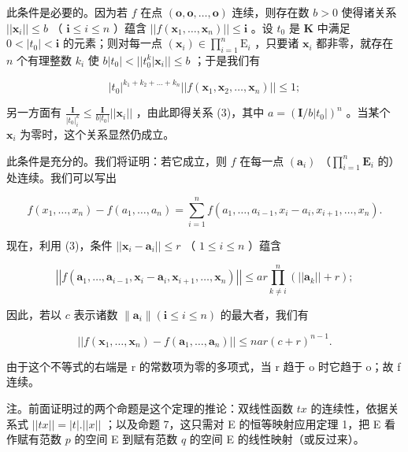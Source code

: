 此条件是必要的。因为若 \(f\) 在点 \((\mathbf{o}, \mathbf{o}, \ldots, \mathbf{o})\) 连续，则存在数 \(b > 0\) 使得诸关系 \(||\boldsymbol{x}_i|| \leqslant b\) （ \(\mathbf{i} \leqslant i \leqslant n\) ）蕴含 \(||f(\boldsymbol{x}_1, \ldots, \boldsymbol{x}_n)|| \leqslant \mathbf{i}\) 。设 \(t_0\) 是 \(\mathbf{K}\) 中满足 \(0 < |t_0| < \mathbf{i}\) 的元素；则对每一点 \((\boldsymbol{x}_i) \in \prod_{i=1}^{n} \mathrm{E}_i\) ，只要诸 \(\boldsymbol{x}_i\) 都非零，就存在 \(n\) 个有理整数 \(k_i\) 使 \(b|t_0| < ||t_0^k |\boldsymbol{x}_i|| \leqslant b\) ；于是我们有

\[
\left| t _ {0} \right| ^ {k _ {1} + k _ {2} + \dots + k _ {n}} \left| \left| f \left(\boldsymbol {x} _ {1}, \boldsymbol {x} _ {2}, \dots , \boldsymbol {x} _ {n}\right) \right| \right| \leqslant 1;
\]

另一方面有 \(\frac{\mathbf{I}}{|t_0|^k_i} \leqslant \frac{\mathbf{I}}{b|t_0|} ||\boldsymbol{x}_i||\) ，由此即得关系 (3)，其中 \(a = (\mathbf{I}/b|t_0|)^n\) 。当某个 \(\boldsymbol{x}_i\) 为零时，这个关系显然仍成立。

此条件是充分的。我们将证明：若它成立，则 \(f\) 在每一点 \((\pmb{a}_i)\) （\(\prod_{i=1}^{n} \mathbf{E}_i\) 的）处连续。我们可以写出

\[
f \left(x _ {1}, \dots , x _ {n}\right) - f \left(a _ {1}, \dots , a _ {n}\right) = \sum_ {i = 1} ^ {n} f \left(a _ {1}, \dots , a _ {i - 1}, x _ {i} - a _ {i}, x _ {i + 1}, \dots , x _ {n}\right).
\]

现在，利用 (3)，条件 \(||\pmb{x}_i - \pmb{a}_i|| \leqslant r\) （ \(1 \leqslant i \leqslant n\) ）蕴含

\[
\left| \left| f \left(\boldsymbol {a} _ {1}, \dots , \boldsymbol {a} _ {i - 1}, \boldsymbol {x} _ {i} - \boldsymbol {a} _ {i}, \boldsymbol {x} _ {i + 1}, \dots , \boldsymbol {x} _ {n}\right) \right| \right| \leqslant a r \prod_ {k \neq i} ^ {n} \left(\left| \left| \boldsymbol {a} _ {k} \right| \right| + r\right);
\]

因此，若以 \(c\) 表示诸数 \(\| \pmb{a}_i \| (\mathbf{i} \leqslant i \leqslant n)\) 的最大者，我们有

\[
\left| \left| f \left(\boldsymbol {x} _ {1}, \dots , \boldsymbol {x} _ {n}\right) - f \left(\boldsymbol {a} _ {1}, \dots , \boldsymbol {a} _ {n}\right) \right| \right| \leqslant n a r (c + r) ^ {n - 1}.
\]

由于这个不等式的右端是 r 的常数项为零的多项式，当 r 趋于 o 时它趋于 o；故 f 连续。

注。前面证明过的两个命题是这个定理的推论：双线性函数 \(tx\) 的连续性，依据关系式 \(||tx|| = |t|.||x||\) ；以及命题 7，这只需对 E 的恒等映射应用定理 1，把 E 看作赋有范数 \(p\) 的空间 E 到赋有范数 \(q\) 的空间 E 的线性映射（或反过来）。

